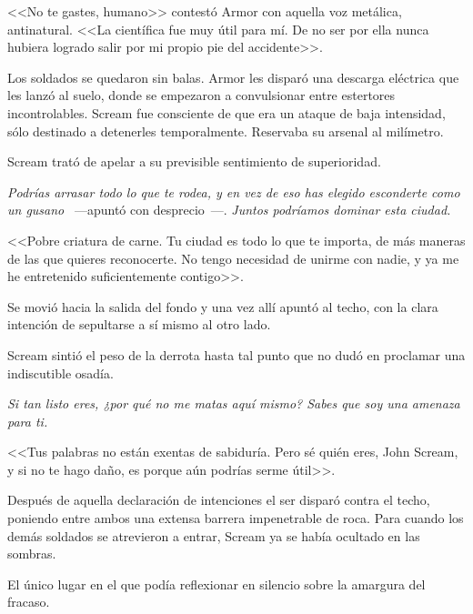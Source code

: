 <<No te gastes, humano>> contestó Armor con aquella voz metálica, antinatural. <<La científica fue muy útil para mí. De no ser por ella nunca hubiera logrado salir por mi propio pie del accidente>>.

Los soldados se quedaron sin balas. Armor les disparó una descarga eléctrica que les lanzó al suelo, donde se empezaron a convulsionar entre estertores incontrolables. Scream fue consciente de que era un ataque de baja intensidad, sólo destinado a detenerles temporalmente. Reservaba su arsenal al milímetro.

Scream trató de apelar a su previsible sentimiento de superioridad.

\emph{Podrías arrasar todo lo que te rodea, y en vez de eso has elegido esconderte como un gusano} ~---apuntó con desprecio~---. \emph{Juntos podríamos dominar esta ciudad.}

<<Pobre criatura de carne. Tu ciudad es todo lo que te importa, de más maneras de las que quieres reconocerte. No tengo necesidad de unirme con nadie, y ya me he entretenido suficientemente contigo>>.

Se movió hacia la salida del fondo y una vez allí apuntó al techo, con la clara intención de sepultarse a sí mismo al otro lado.

Scream sintió el peso de la derrota hasta tal punto que no dudó en proclamar una indiscutible osadía.

\emph{Si tan listo eres, ¿por qué no me matas aquí mismo? Sabes que soy una amenaza para ti.}

<<Tus palabras no están exentas de sabiduría. Pero sé quién eres, John Scream, y si no te hago daño, es porque aún podrías serme útil>>.

Después de aquella declaración de intenciones el ser disparó contra el techo, poniendo entre ambos una extensa barrera impenetrable de roca. Para cuando los demás soldados se atrevieron a entrar, Scream ya se había ocultado en las sombras.

El único lugar en el que podía reflexionar en silencio sobre la amargura del fracaso.

\endinput
